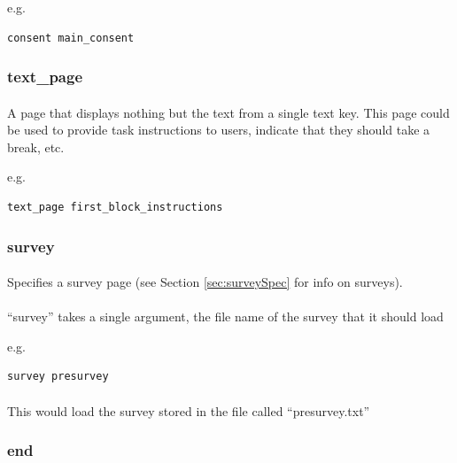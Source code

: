 \documentclass[12pt, oneside]{scrbook}   	%
\begin{document}
e.g.

\begin{lstlisting}
consent main_consent
\end{lstlisting}

\subsubsection{text\_page}

\paragraph{}
A page that displays nothing but the text from a single text key.  This page could be used to provide task instructions to users, indicate that they should take a break, etc.

e.g.

\begin{lstlisting}
text_page first_block_instructions
\end{lstlisting}

\subsubsection{survey}

\paragraph{}
Specifies a survey page (see Section \ref{sec:surveySpec} for info on surveys).

\paragraph{}
``survey'' takes a single argument, the file name of the survey that it should load

e.g.

\begin{lstlisting}
survey presurvey
\end{lstlisting}

\paragraph{}
This would load the survey stored in the file called ``presurvey.txt''

\subsubsection{end}
\end{document}
